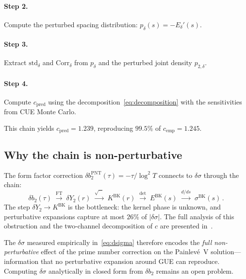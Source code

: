 \documentclass[11pt]{article}
\theoremstyle{plain}
\theoremstyle{remark}
\begin{document}
\paragraph{Step 2.}
Compute the perturbed spacing distribution:
$p_\delta(s) = -E_\delta'(s)$.

\paragraph{Step 3.}
Extract $\mathrm{std}_\delta$ and $\mathrm{Corr}_\delta$ from $p_\delta$
and the perturbed joint density $p_{2,\delta}$.

\paragraph{Step 4.}
Compute $c_{\mathrm{pred}}$ using the decomposition~\eqref{eq:decomposition}
with the sensitivities from CUE Monte Carlo.

This chain yields $c_{\mathrm{pred}} = 1.239$, reproducing $99.5\%$ of
$c_{\mathrm{emp}} = 1.245$.

\subsection{Why the chain is non-perturbative}

The form factor correction $\delta b_2^{\mathrm{PNT}}(\tau) = -\tau/\log^2 T$
connects to $\delta\sigma$ through the chain:
\begin{equation}
\delta b_2(\tau) \;\xrightarrow{\mathrm{FT}}\;
\delta Y_2(r) \;\xrightarrow{\sqrt{\;\cdot\;}}\;
K^{\mathrm{BK}}(r) \;\xrightarrow{\det}\;
E^{\mathrm{BK}}(s) \;\xrightarrow{d/ds}\;
\sigma^{\mathrm{BK}}(s)\,.
\label{eq:chain}
\end{equation}
The step $\delta Y_2 \to K^{\mathrm{BK}}$ is the bottleneck:
the kernel phase is unknown, and perturbative expansions capture at most
$26\%$ of $|\delta\sigma|$. The full analysis of this obstruction and the
two-channel decomposition of $c$ are presented in~\cite{alarcon2026b}.

The $\delta\sigma$ measured empirically in~\eqref{eq:dsigma} therefore
encodes the \emph{full non-perturbative} effect of the prime number
correction on the Painlev\'e~V solution---information that no
perturbative expansion around GUE can reproduce. Computing $\delta\sigma$
analytically in closed form from $\delta b_2$ remains an open problem.
\end{document}
